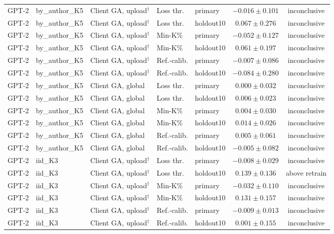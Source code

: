 {\begin{longtable}{@{\extracolsep{\fill}}lllllcc@{}}
GPT-2 & by\_author\_K5 & Client GA, upload$^{\dagger}$ & Loss thr. & primary & $-0.016 \pm 0.101$ & inconclusive \\
GPT-2 & by\_author\_K5 & Client GA, upload$^{\dagger}$ & Loss thr. & holdout10 & $0.067 \pm 0.276$ & inconclusive \\
GPT-2 & by\_author\_K5 & Client GA, upload$^{\dagger}$ & Min-K\% & primary & $-0.052 \pm 0.127$ & inconclusive \\
GPT-2 & by\_author\_K5 & Client GA, upload$^{\dagger}$ & Min-K\% & holdout10 & $0.061 \pm 0.197$ & inconclusive \\
GPT-2 & by\_author\_K5 & Client GA, upload$^{\dagger}$ & Ref.-calib. & primary & $-0.007 \pm 0.086$ & inconclusive \\
GPT-2 & by\_author\_K5 & Client GA, upload$^{\dagger}$ & Ref.-calib. & holdout10 & $-0.084 \pm 0.280$ & inconclusive \\
GPT-2 & by\_author\_K5 & Client GA, global & Loss thr. & primary & $0.000 \pm 0.032$ & inconclusive \\
GPT-2 & by\_author\_K5 & Client GA, global & Loss thr. & holdout10 & $0.006 \pm 0.023$ & inconclusive \\
GPT-2 & by\_author\_K5 & Client GA, global & Min-K\% & primary & $0.004 \pm 0.030$ & inconclusive \\
GPT-2 & by\_author\_K5 & Client GA, global & Min-K\% & holdout10 & $0.014 \pm 0.026$ & inconclusive \\
GPT-2 & by\_author\_K5 & Client GA, global & Ref.-calib. & primary & $0.005 \pm 0.061$ & inconclusive \\
GPT-2 & by\_author\_K5 & Client GA, global & Ref.-calib. & holdout10 & $-0.005 \pm 0.082$ & inconclusive \\
GPT-2 & iid\_K3 & Client GA, upload$^{\dagger}$ & Loss thr. & primary & $-0.008 \pm 0.029$ & inconclusive \\
GPT-2 & iid\_K3 & Client GA, upload$^{\dagger}$ & Loss thr. & holdout10 & $0.139 \pm 0.136$ & above retrain \\
GPT-2 & iid\_K3 & Client GA, upload$^{\dagger}$ & Min-K\% & primary & $-0.032 \pm 0.110$ & inconclusive \\
GPT-2 & iid\_K3 & Client GA, upload$^{\dagger}$ & Min-K\% & holdout10 & $0.131 \pm 0.157$ & inconclusive \\
GPT-2 & iid\_K3 & Client GA, upload$^{\dagger}$ & Ref.-calib. & primary & $-0.009 \pm 0.013$ & inconclusive \\
GPT-2 & iid\_K3 & Client GA, upload$^{\dagger}$ & Ref.-calib. & holdout10 & $0.001 \pm 0.155$ & inconclusive \\

\end{longtable}}
